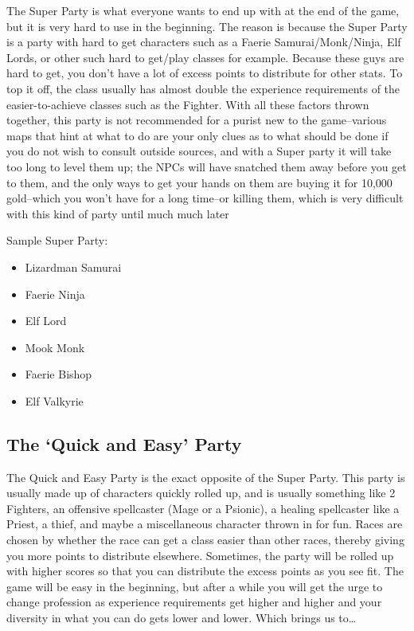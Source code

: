 \documentclass[12pt]{article}
\providecommand{\tightlist}{%
  \setlength{\itemsep}{0pt}\setlength{\parskip}{0pt}}
\begin{document}
The Super Party is what everyone wants to end up with at the end of the
game, but it is very hard to use in the beginning. The reason is because
the Super Party is a party with hard to get characters such as a Faerie
Samurai/Monk/Ninja, Elf Lords, or other such hard to get/play classes
for example. Because these guys are hard to get, you don't have a lot of
excess points to distribute for other stats. To top it off, the class
usually has almost double the experience requirements of the
easier-to-achieve classes such as the Fighter. With all these factors
thrown together, this party is not recommended for a purist new to the
game--various maps that hint at what to do are your only clues as to
what should be done if you do not wish to consult outside sources, and
with a Super party it will take too long to level them up; the NPCs will
have snatched them away before you get to them, and the only ways to get
your hands on them are buying it for 10,000 gold--which you won't have
for a long time--or killing them, which is very difficult with this kind
of party until much much later

Sample Super Party:

\begin{itemize}
\tightlist
\item
  Lizardman Samurai
\item
  Faerie Ninja
\item
  Elf Lord
\item
  Mook Monk
\item
  Faerie Bishop
\item
  Elf Valkyrie
\end{itemize}

\subsection{\texorpdfstring{The `Quick and Easy'
Party}{The Quick and Easy Party}}\label{the-quick-and-easy-party}

The Quick and Easy Party is the exact opposite of the Super Party. This
party is usually made up of characters quickly rolled up, and is usually
something like 2 Fighters, an offensive spellcaster (Mage or a Psionic),
a healing spellcaster like a Priest, a thief, and maybe a miscellaneous
character thrown in for fun. Races are chosen by whether the race can
get a class easier than other races, thereby giving you more points to
distribute elsewhere. Sometimes, the party will be rolled up with higher
scores so that you can distribute the excess points as you see fit. The
game will be easy in the beginning, but after a while you will get the
urge to change profession as experience requirements get higher and
higher and your diversity in what you can do gets lower and lower. Which
brings us to\ldots{}
\end{document}
